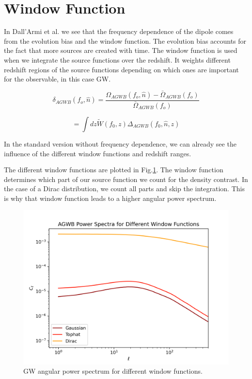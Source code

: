 \section{Window Function}
\label{window_fct_section}

In Dall'Armi et al. \cite{dallarmi_dipole_2022} we see that the frequency dependence 
of the dipole comes from the evolution bias and the window function. The evolution 
bias accounts for the fact that more sources are created with time. The window 
function is used when we integrate the source functions over the redshift. It weights different redshift regions of the source functions depending on which ones are important for the observable, in this case GW.


\begin{equation}
    \delta_{AGWB}(f_o, \hat{n})=\frac{\Omega_{AGWB}(f_o, \hat{n})-\bar{\Omega}_{AGWB}(f_o)}{\bar{\Omega}_{AGWB}(f_o)}
\end{equation}

\begin{equation}
\label{window_fct_int}
    =\int dz \tilde{W}(f_0, z)\Delta_{AGWB}(f_0, \hat{n}, z)
\end{equation}


In the standard version without frequency dependence, we can already see the influence of the different window functions and redshift ranges.

The different window functions are plotted in Fig.\ref{plot_Cl_window_fct}. The window function determines which part of our source function we count for the density contrast. In the case of a Dirac distribution, we count all parts and skip the integration. This is why that window function leads to a higher angular power spectrum.\\
\begin{figure}[h]
 \centering
 \includegraphics[width=0.7\linewidth]{Images/diff_windows.png}
 \caption{GW angular power spectrum for different window functions.}
 \label{plot_Cl_window_fct}
\end{figure} 

